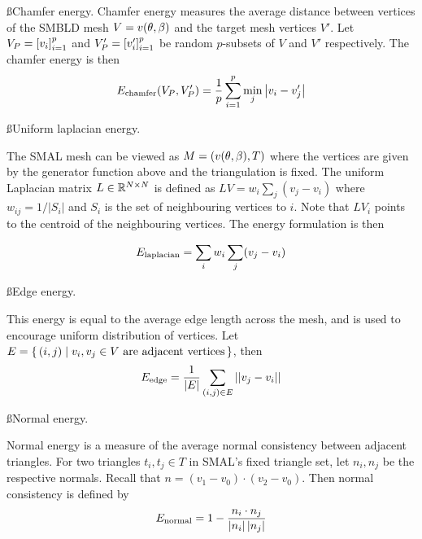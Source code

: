 \ss{Chamfer energy.} Chamfer energy measures the average distance between vertices of the SMBLD mesh $V = v(\theta,\beta)$ and the target mesh vertices $V'$. Let $V_{P} = \left[{v_{i}}\right]_{i=1}^{p}$ and $V'_{P} = \left[{v'_{i}}\right]_{i=1}^{p}$ be random $p$-subsets of $V$ and $V'$ respectively. The chamfer energy is then
\begin{equation}
        E_\textrm{chamfer}(V_{P}, V'_{P}) = \frac{1}{p} \sum_{i=1}^{p} \min_{j}  \left | v_{i} - v'_{j} \right |
\end{equation}

\ss{Uniform laplacian energy.} 



The SMAL mesh can be viewed as $M = (v(\theta,\beta), T)$ where the vertices are given by the generator function above and the triangulation is fixed. The uniform Laplacian matrix $L \in {\mathbb{R}^{N \times N}}$ is defined as $LV = w_{i} \sum_{j} (v_{j} - v_{i})$ where $w_{ij} = 1 / |S_{i}|$ and $S_{i}$ is the set of neighbouring vertices to $i$. Note that $LV_{i}$ points to the centroid of the neighbouring vertices. The energy formulation is then

\begin{equation}
    E_\textrm{laplacian} = \sum_{i} w_{i} \sum_{j} (v_{j} - v_{i})
\end{equation}



\ss{Edge energy.} 

This energy is equal to the average edge length across the mesh, and is used to encourage uniform distribution of vertices. Let $E = \{\,(i,j)\mid\text{$v_{i}, v_{j} \in V$ are adjacent vertices}\,\}$, then
\begin{equation}
    E_\textrm{edge} = \frac{1}{|E|} \sum_{(i,j) \in E} || v_{j} - v_{i} ||
\end{equation}

\ss{Normal energy.} 

Normal energy is a measure of the average normal consistency between adjacent triangles. For two triangles $t_{i}, t_{j} \in T$ in SMAL's fixed triangle set, let $n_{i}, n_{j}$ be the respective normals. Recall that $n = (v_{1} - v_{0}) \cdot (v_{2} - v_{0})$. Then normal consistency is defined by
\begin{equation}
    E_\textrm{normal} = 1 - \frac{n_{i} \cdot n_{j}}{\left|n_{i}\right|\left|n_{j}\right|}
\end{equation}

